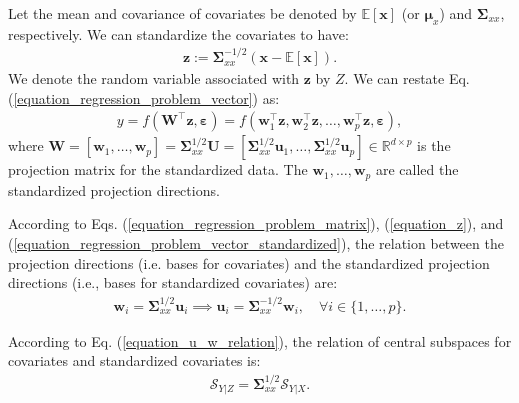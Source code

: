 \documentclass[lang=cn,10pt]{gorgeousnbook}
\numberwithin{equation}{section}%
\numberwithin{figure}{section}%
\begin{document}
Let the mean and covariance of covariates be denoted by $\mathbb{E}[\boldsymbol{x}]$ (or $\boldsymbol{\mu}_x$) and $\boldsymbol{\Sigma}_{xx}$, respectively.
We can standardize the covariates to have:
\begin{align}\label{equation_z}
\boldsymbol{z} := \boldsymbol{\Sigma}_{xx}^{-1/2} (\boldsymbol{x} - \mathbb{E}[\boldsymbol{x}]).
\end{align}
We denote the random variable associated with $\boldsymbol{z}$ by $Z$.
We can restate Eq. (\ref{equation_regression_problem_vector}) as:
\begin{align}\label{equation_regression_problem_vector_standardized}
y = f(\boldsymbol{W}^\top \boldsymbol{z}, \boldsymbol{\varepsilon}) = f(\boldsymbol{w}_1^\top \boldsymbol{z}, \boldsymbol{w}_2^\top \boldsymbol{z}, \dots, \boldsymbol{w}_p^\top \boldsymbol{z}, \boldsymbol{\varepsilon}),
\end{align}
where $\boldsymbol{W} = [\boldsymbol{w}_1, \dots, \boldsymbol{w}_p] = \boldsymbol{\Sigma}_{xx}^{1/2} \boldsymbol{U} = [\boldsymbol{\Sigma}_{xx}^{1/2} \boldsymbol{u}_1, \dots, \boldsymbol{\Sigma}_{xx}^{1/2} \boldsymbol{u}_p] \in \mathbb{R}^{d \times p}$ is the projection matrix for the standardized data. 
The $\boldsymbol{w}_1, \dots, \boldsymbol{w}_p$ are called the standardized projection directions. 

\begin{corollary}
According to Eqs. (\ref{equation_regression_problem_matrix}), (\ref{equation_z}), and (\ref{equation_regression_problem_vector_standardized}), the relation between the projection directions (i.e. bases for covariates) and the standardized projection directions (i.e., bases for standardized covariates) are:
\begin{align}\label{equation_u_w_relation}
\boldsymbol{w}_i = \boldsymbol{\Sigma}_{xx}^{1/2} \boldsymbol{u}_i \implies \boldsymbol{u}_i = \boldsymbol{\Sigma}_{xx}^{-1/2} \boldsymbol{w}_i, \quad \forall i \in \{1, \dots, p\}.
\end{align}
\end{corollary}

\begin{corollary}
According to Eq. (\ref{equation_u_w_relation}), the relation of central subspaces for covariates and standardized covariates is:
\begin{align}
\mathcal{S}_{Y|Z} = \boldsymbol{\Sigma}_{xx}^{1/2} \mathcal{S}_{Y|X}.
\end{align}
\end{corollary}
\end{document}
